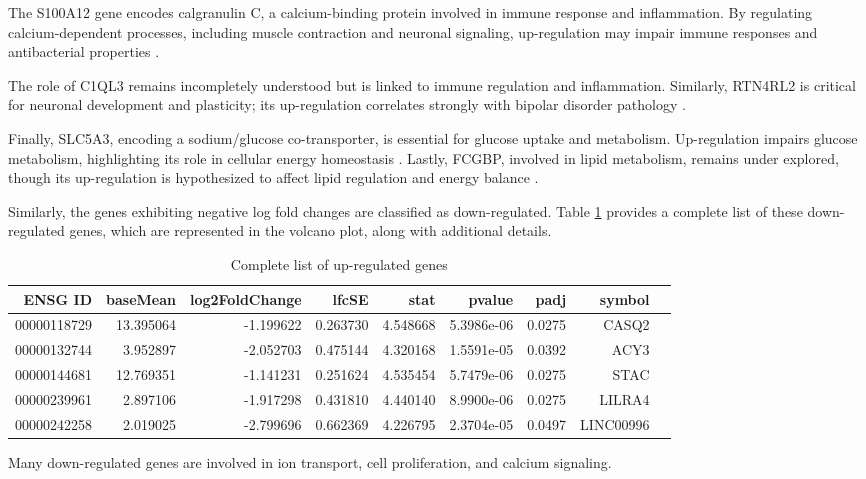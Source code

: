 The S100A12 gene encodes calgranulin C, a calcium-binding protein involved in immune response and inflammation. By regulating calcium-dependent processes, including muscle contraction and neuronal signaling, up-regulation may impair immune responses and antibacterial properties \cite{Foell2007S100}.

The role of C1QL3 remains incompletely understood but is linked to immune regulation and inflammation. Similarly, RTN4RL2 is critical for neuronal development and plasticity; its up-regulation correlates strongly with bipolar disorder pathology \cite{Smith2019Neurodevelopment}.

Finally, SLC5A3, encoding a sodium/glucose co-transporter, is essential for glucose uptake and metabolism. Up-regulation impairs glucose metabolism, highlighting its role in cellular energy homeostasis \cite{Chen2019SLC5A}. Lastly, FCGBP, involved in lipid metabolism, remains under explored, though its up-regulation is hypothesized to affect lipid regulation and energy balance \cite{Kim2020Lipids}.

Similarly, the genes exhibiting negative log fold changes are classified as down-regulated. Table \ref{table:down_regulated} provides a complete list of these down-regulated genes, which are represented in the volcano plot, along with additional details.

\begin{table}[H]
    \centering
    \begin{tabular}{rrrrrrrrl}
    \toprule
    ENSG ID & baseMean & log2FoldChange & lfcSE & stat & pvalue & padj & symbol \\
    \midrule
    00000118729 & 13.395064 & -1.199622 & 0.263730 & 4.548668 & 5.3986e-06 & 0.0275 & CASQ2 \\
    00000132744 & 3.952897 & -2.052703 & 0.475144 & 4.320168 & 1.5591e-05 & 0.0392 & ACY3 \\
    00000144681 & 12.769351 & -1.141231 & 0.251624 & 4.535454 & 5.7479e-06 & 0.0275 & STAC \\
    00000239961 & 2.897106 & -1.917298 & 0.431810 & 4.440140 & 8.9900e-06 & 0.0275 & LILRA4 \\
    00000242258 & 2.019025 & -2.799696 & 0.662369 & 4.226795 & 2.3704e-05 & 0.0497 & LINC00996 \\
    \bottomrule
    \end{tabular}
    \caption{Complete list of up-regulated genes}
    \label{table:down_regulated}
\end{table}
Many down-regulated genes are involved in ion transport, cell proliferation, and calcium signaling. 

